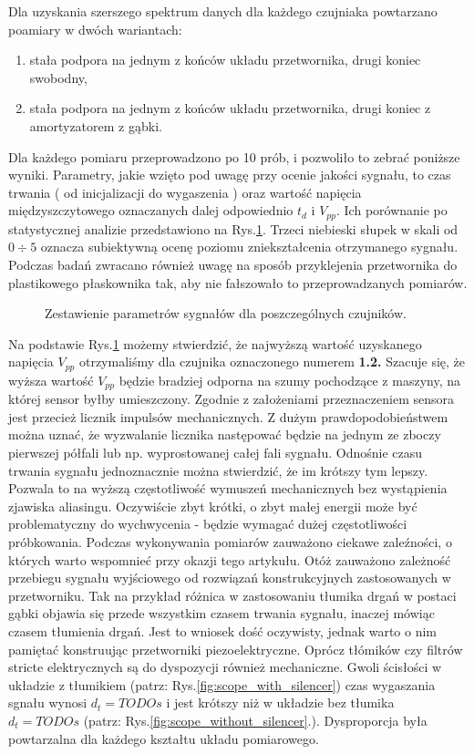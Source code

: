 Dla uzyskania szerszego spektrum danych dla każdego czujniaka powtarzano poamiary w dwóch wariantach: 
\begin{enumerate}
\item stała podpora na jednym z końców układu przetwornika, drugi koniec swobodny,
\item stała podpora na jednym z końców układu przetwornika, drugi koniec z amortyzatorem z gąbki.
\end{enumerate}
Dla każdego pomiaru przeprowadzono po 10 prób, i pozwoliło to zebrać poniższe wyniki. Parametry, jakie wzięto pod uwagę przy ocenie jakości sygnału, to czas trwania ( od inicjalizacji do wygaszenia ) oraz wartość napięcia międzyszczytowego oznaczanych dalej odpowiednio $t_d$ i $V_{pp}$. Ich porównanie po statystycznej analizie przedstawiono na Rys.\ref{fig:sensor_sel_geometry}. Trzeci niebieski słupek w skali od $0\div5$ oznacza subiektywną ocenę poziomu zniekształcenia otrzymanego sygnału. Podczas badań zwracano również uwagę na sposób przyklejenia przetwornika do plastikowego płaskownika tak, aby nie fałszowało to przeprowadzanych pomiarów. 

\begin{figure}[htbp]
\centering
{}%
\caption{Zestawienie parametrów sygnałów dla poszczególnych czujników.}
\label{fig:sensor_sel_geometry}
\end{figure}

Na podstawie Rys.\ref{fig:sensor_sel_geometry} możemy stwierdzić, że najwyższą wartość uzyskanego napięcia $V_{pp}$ otrzymaliśmy dla czujnika oznaczonego numerem \textbf{1.2.} Szacuje się, że wyższa wartość $V_{pp}$ będzie bradziej odporna na szumy pochodzące z maszyny, na której sensor byłby umieszczony. Zgodnie z założeniami przeznaczeniem sensora jest przecież licznik impulsów mechanicznych. Z dużym prawdopodobieństwem można uznać, że wyzwalanie licznika następować będzie na jednym ze zboczy pierwszej półfali lub np. wyprostowanej całej fali sygnału. 
\ident Odnośnie czasu trwania sygnału jednoznacznie można stwierdzić, że im krótszy tym lepszy. Pozwala to na wyższą częstotliwość wymuszeń mechanicznych bez wystąpienia zjawiska aliasingu. Oczywiście zbyt krótki, o zbyt małej energii może być problematyczny do wychwycenia - będzie wymagać dużej częstotliwości próbkowania.
\ident Podczas wykonywania pomiarów zauważono ciekawe zaleźności, o których warto wspomnieć przy okazji tego artykułu. Otóż zauważono zależność przebiegu sygnału wyjściowego od rozwiązań konstrukcyjnych zastosowanych w przetworniku. Tak na przykład różnica w zastosowaniu tłumika drgań w postaci gąbki objawia się przede wszystkim czasem trwania sygnału, inaczej mówiąc czasem tłumienia drgań. Jest to wniosek dość oczywisty, jednak warto o nim pamiętać konstruując przetworniki piezoelektryczne. Oprócz tłómików czy filtrów stricte elektrycznych są do dyspozycji również mechaniczne. Gwoli ścisłości w układzie z tłumikiem (patrz: Rys.\ref{fig:scope_with_silencer}) czas wygaszania sgnału wynosi $d_t = TODOs$ i jest krótszy niż w układzie bez tłumika $d_t = TODOs$ (patrz: Rys.\ref{fig:scope_without_silencer}.). Dysproporcja była powtarzalna dla każdego kształtu układu pomiarowego.

